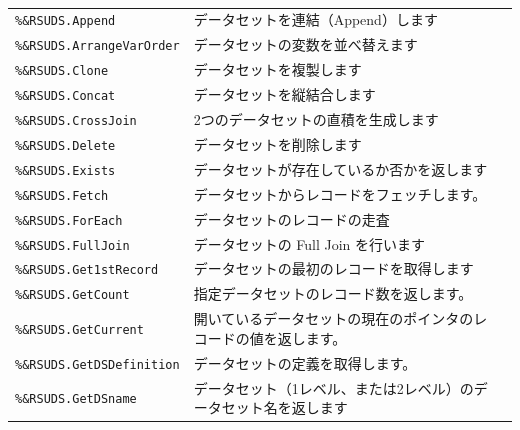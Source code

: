 \paragraph{\DocStrTitleRDMPackageFunctionList}
\begin{center}
{\footnotesize
\begin{xltabular}{\textwidth}{|p{4truecm}|X|p{1.2truecm}|}
\hline
\thead{\DocStrHeaderFunctionName}&\thead{\DocStrDescription}&\thead{\DocStrRefto}\\
\hline
\hline
\texttt{\%\&RSUDS.Append}&データセットを連結（Append）します&\\
\hline
\texttt{\%\&RSUDS.ArrangeVarOrder}&データセットの変数を並べ替えます&\\
\hline
\texttt{\%\&RSUDS.Clone}&データセットを複製します&\\
\hline
\texttt{\%\&RSUDS.Concat}&データセットを縦結合します&\\
\hline
\texttt{\%\&RSUDS.CrossJoin}&2つのデータセットの直積を生成します&\\
\hline
\texttt{\%\&RSUDS.Delete}&データセットを削除します&\\
\hline
\texttt{\%\&RSUDS.Exists}&データセットが存在しているか否かを返します&\\
\hline
\texttt{\%\&RSUDS.Fetch}&データセットからレコードをフェッチします。&\\
\hline
\texttt{\%\&RSUDS.ForEach}&データセットのレコードの走査&\\
\hline
\texttt{\%\&RSUDS.FullJoin}&データセットの Full Join を行います&\\
\hline
\texttt{\%\&RSUDS.Get1stRecord}&データセットの最初のレコードを取得します&\\
\hline
\texttt{\%\&RSUDS.GetCount}&指定データセットのレコード数を返します。&\\
\hline
\texttt{\%\&RSUDS.GetCurrent}&開いているデータセットの現在のポインタのレコードの値を返します。&\\
\hline
\texttt{\%\&RSUDS.GetDSDefinition}&データセットの定義を取得します。&\\
\hline
\texttt{\%\&RSUDS.GetDSname}&データセット（1レベル、または2レベル）のデータセット名を返します&\\

\end{xltabular}}
\end{center}
